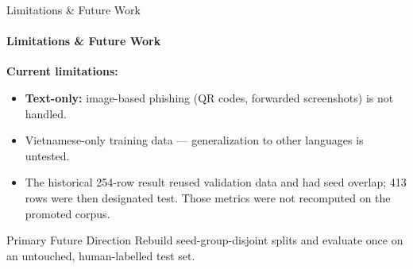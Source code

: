 \begin{frame}{Limitations \& Future Work}
  \framesubtitle{Limitations \& Future Work}
  \textbf{Current limitations:}
  \begin{itemize}
    \item \textbf{Text-only:} image-based phishing (QR codes, forwarded screenshots) is not handled.
    \item Vietnamese-only training data --- generalization to other languages is untested.
    \item The historical 254-row result reused validation data and had seed overlap; 413 rows were then designated test. Those metrics were not recomputed on the promoted corpus.
  \end{itemize}
  \begin{block}{Primary Future Direction}
    Rebuild seed-group-disjoint splits and evaluate once on an untouched, human-labelled test set.
  \end{block}
\end{frame}
